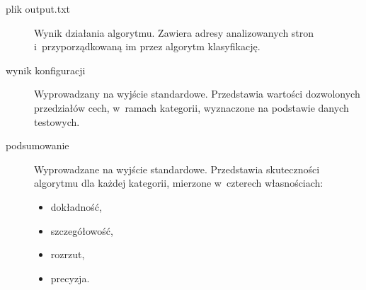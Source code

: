 \documentclass[a4paper,11pt]{article}
\begin{document}
\begin{description}
    \item[plik output.txt] Wynik działania algorytmu. Zawiera adresy analizowanych stron i~przyporządkowaną im przez algorytm klasyfikację.
    \item[wynik konfiguracji] Wyprowadzany na wyjście standardowe. Przedstawia wartości dozwolonych przedziałów cech, w~ramach kategorii, wyznaczone na podstawie danych testowych.
    \item[podsumowanie] Wyprowadzane na wyjście standardowe. Przedstawia skuteczności algorytmu dla każdej kategorii, mierzone w~czterech własnościach:
        \begin{itemize}
            \item dokładność,
            \item szczegółowość,
            \item rozrzut,
            \item precyzja.
        \end{itemize}
\end{description}
\end{document}
